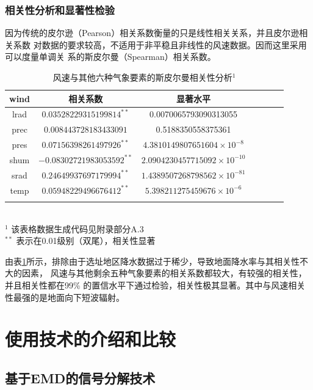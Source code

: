 \documentclass[AutoFakeBold]{LZUThesis}
\begin{document}
\subsection{相关性分析和显著性检验}
因为传统的皮尔逊（Pearson）相关系数衡量的只是线性相关关系，并且皮尔逊相关系数
对数据的要求较高，不适用于非平稳且非线性的风速数据。因而这里采用可以度量单调关
系的斯皮尔曼（Spearman）相关系数。

\begin{table}[H]
    \centering
    \caption{风速与其他六种气象要素的斯皮尔曼相关性分析$^1$}
    \begin{tabular}{ccccccc}
    \toprule
    wind & 相关系数 & 显著水平 \\
    \midrule
    lrad & $0.03528229315199814^{**}$ & 0.0070065793090313055 \\
    prec & $0.008443728183433091$ & 0.5188350558375361 \\
    pres & $0.07156398261497926^{**}$ & $4.3810149807651604\times10^{-8}$ \\
    shum & $-0.08302721983053592^{**}$ & $2.0904230457715092\times10^{-10}$ \\
    srad & $0.24649937697179994^{**}$ & $1.4389507268798562\times10^{-81}$ \\
    temp & $0.05948229496676412^{**}$ & $5.398211275459676\times10^{-6}$ \\
    \bottomrule \\
    \end{tabular} \\
    \footnotesize{$^1$ 该表格数据生成代码见附录部分A.3} \\
    \footnotesize{$^{**}$ 表示在0.01级别（双尾），相关性显著} \\
    \label{relativity-analysis}
\end{table}

由表\ref{relativity-analysis}所示，排除由于选址地区降水数据过于稀少，导致地面降水率与其相关性不大的因素，
风速与其他剩余五种气象要素的相关系数都较大，有较强的相关性，并且相关性都在99\%
的置信水平下通过检验，相关性极其显著。其中与风速相关性最强的是地面向下短波辐射。



\chapter{使用技术的介绍和比较}
\section{基于EMD的信号分解技术}
\end{document}

